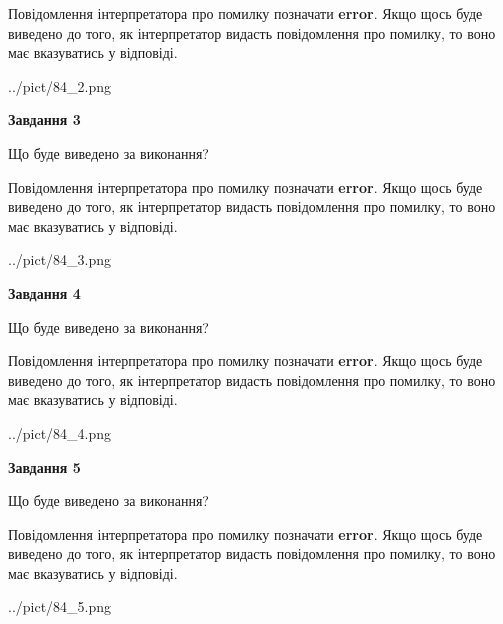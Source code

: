 \documentclass[12pt, ukrainian]{article}
\begin{document}
{\begin {large}
Повідомлення інтерпретатора про помилку позначати \textbf{error}.
Якщо щось буде виведено до того, як інтерпретатор видасть повідомлення про помилку, 
то воно має вказуватись у відповіді. \par


\begin{center}
	{../pict/84_2.png}
\end{center}
\newpage

{\begin {center}\textbf{Завдання 3}\end {center}}\par
Що буде виведено за виконання?

Повідомлення інтерпретатора про помилку позначати \textbf{error}.
Якщо щось буде виведено до того, як інтерпретатор видасть повідомлення про помилку, 
то воно має вказуватись у відповіді. \par


\begin{center}
	{../pict/84_3.png}
\end{center}
\newpage

{\begin {center}\textbf{Завдання 4}\end {center}}\par
Що буде виведено за виконання?

Повідомлення інтерпретатора про помилку позначати \textbf{error}.
Якщо щось буде виведено до того, як інтерпретатор видасть повідомлення про помилку, 
то воно має вказуватись у відповіді. \par


\begin{center}
	{../pict/84_4.png}
\end{center}
\newpage

{\begin {center}\textbf{Завдання 5}\end {center}}\par
Що буде виведено за виконання?

Повідомлення інтерпретатора про помилку позначати \textbf{error}.
Якщо щось буде виведено до того, як інтерпретатор видасть повідомлення про помилку, 
то воно має вказуватись у відповіді. \par


\begin{center}
	{../pict/84_5.png}
\end{center}
\newpage


\end{large}}
\end{document}
